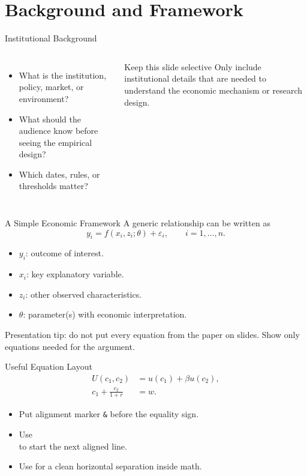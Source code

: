 \documentclass[10pt]{beamer}
\begin{document}
\section{Background and Framework}

\begin{frame}{Institutional Background}
\begin{columns}[T]
\begin{itemize}
  \item What is the institution, policy, market, or environment?
  \item What should the audience know before seeing the empirical design?
  \item Which dates, rules, or thresholds matter?
\end{itemize}

\begin{block}{Keep this slide selective}
Only include institutional details that are needed to understand the economic mechanism or research design.
\end{block}
\end{columns}
\end{frame}

\begin{frame}{A Simple Economic Framework}
A generic relationship can be written as
\[
  y_i = f(x_i,z_i;\theta) + \varepsilon_i,
  \qquad i=1,\ldots,n.
\]

\begin{itemize}
  \item $y_i$: outcome of interest.
  \item $x_i$: key explanatory variable.
  \item $z_i$: other observed characteristics.
  \item $\theta$: parameter(s) with economic interpretation.
\end{itemize}

\vspace{0.4em}
\alert{Presentation tip:} do not put every equation from the paper on slides. Show only equations needed for the argument.
\end{frame}

\begin{frame}{Useful Equation Layout}
\begin{align}
  U(c_1,c_2) &= u(c_1) + \beta u(c_2), \\
  c_1 + \frac{c_2}{1+r} &= w.
\end{align}

\begin{itemize}
  \item Put alignment marker \texttt{\&} before the equality sign.
  \item Use \texttt{\\} to start the next aligned line.
  \item Use \texttt{\qquad} for a clean horizontal separation inside math.
\end{itemize}
\end{frame}
\end{document}
